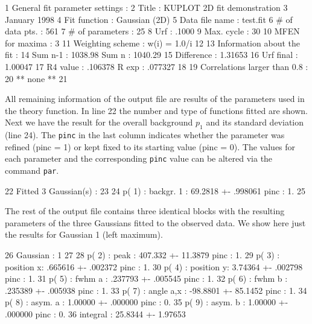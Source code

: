 \begin{MacVerbatim}
     1   General fit parameter settings :
     2     Title            : KUPLOT 2D fit demonstration
     3                        January 1998
     4     Fit function     : Gaussian (2D)
     5     Data file name   : test.fit
     6     # of data pts.   :    561
     7     # of parameters  :     25
     8     Urf              :     .1000
     9     Max. cycle       :     30
    10     MFEN for maxima  :      3
    11     Weighting scheme : w(i) = 1.0/i
    12
    13   Information about the fit :
    14     Sum n-1    :  1038.98                 Sum n   :  1040.29
    15     Difference :  1.31653
    16     Urf final  :  1.00047
    17     R4 value   :  .106378                 R exp   :  .077327
    18
    19   Correlations larger than 0.8 :
    20     ** none **
    21
\end{MacVerbatim}

All remaining information of the output file are results of the
parameters used in the theory function.  In line 22 the number and
type of functions fitted are shown.  Next we have the result for the
overall background $p_{1}$ and its standard deviation (line 24). The
{\tt pinc} in the last column indicates whether the parameter was
refined (pinc = 1) or kept fixed to its starting value (pinc = 0).
The values for each parameter and the corresponding {\tt pinc} value
can be altered via the command {\tt par}.

\begin{MacVerbatim}
    22   Fitted  3 Gaussian(s) :
    23
    24     p( 1) : backgr. 1 :  69.2818     +-  .998061    pinc : 1.
    25
\end{MacVerbatim}

The rest of the output file contains three identical blocks with the
resulting parameters of the three Gaussians fitted to the observed data.
We show here just the results for Gaussian 1 (left maximum).

\begin{MacVerbatim}
    26   Gaussian :   1
    27
    28     p( 2) : peak      :  407.332     +-  11.3879    pinc : 1.
    29     p( 3) : position x:  .665616     +-  .002372    pinc : 1.
    30     p( 4) : position y:  3.74364     +-  .002798    pinc : 1.
    31     p( 5) : fwhm a    :  .237793     +-  .005545    pinc : 1.
    32     p( 6) : fwhm b    :  .235389     +-  .005938    pinc : 1.
    33     p( 7) : angle a,x : -98.8801     +-  85.1452    pinc : 1.
    34     p( 8) : asym. a   :  1.00000     +-  .000000    pinc : 0.
    35     p( 9) : asym. b   :  1.00000     +-  .000000    pinc : 0.
    36             integral  :  25.8344     +-  1.97653
\end{MacVerbatim}

